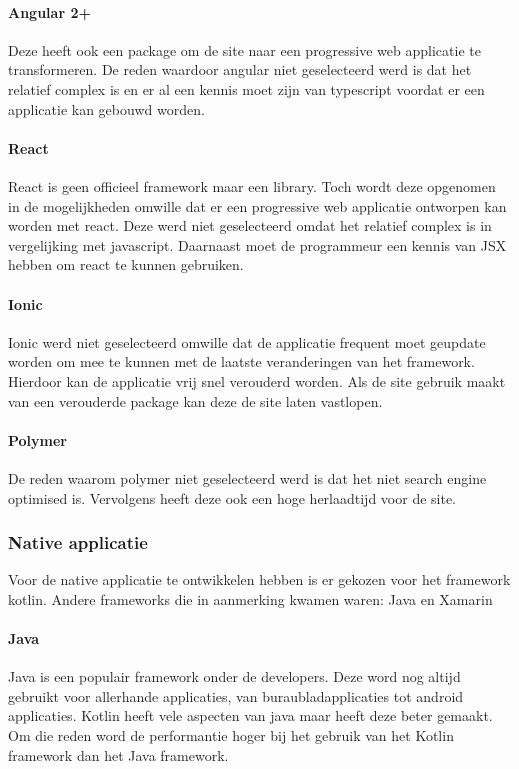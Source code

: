 \paragraph{Angular 2+}
Deze heeft ook een package om de site naar een progressive web applicatie te transformeren.
De reden waardoor angular niet geselecteerd werd is dat het relatief complex is en er al een kennis moet zijn van typescript voordat er een applicatie kan gebouwd worden.

\paragraph{React}
React is geen officieel framework maar een library. Toch wordt deze opgenomen in de mogelijkheden omwille dat er een progressive web applicatie ontworpen kan worden met react. Deze werd niet geselecteerd omdat het relatief complex is in vergelijking met javascript. Daarnaast moet de programmeur een kennis van JSX hebben om react te kunnen gebruiken.

\paragraph{Ionic}
Ionic werd niet geselecteerd omwille dat de applicatie frequent moet geupdate worden om mee te kunnen met de laatste veranderingen van het framework. Hierdoor kan de applicatie vrij snel verouderd worden. Als de site gebruik maakt van een verouderde package kan deze de site laten vastlopen.

\paragraph{Polymer}
De reden waarom polymer niet geselecteerd werd is dat het niet search engine optimised is. Vervolgens heeft deze ook een hoge herlaadtijd voor de site.

\subsubsection{Native applicatie}
Voor de native applicatie te ontwikkelen hebben is er gekozen voor het framework kotlin. Andere frameworks die in aanmerking kwamen waren: Java en Xamarin

\paragraph{Java}
Java is een populair framework onder de developers. Deze word nog altijd gebruikt voor allerhande applicaties, van buraubladapplicaties tot android applicaties. Kotlin heeft vele aspecten van java maar heeft deze beter gemaakt. Om die reden word de performantie hoger bij het gebruik van het Kotlin framework dan het Java framework. \cite{KOTLIN_VS_JAVA}

